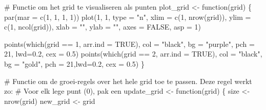 \documentclass[
  a4paper,
]{scrbook}
\newenvironment{Shaded}{\begin{snugshade}}{\end{snugshade}}
\newcommand{\AttributeTok}[1]{\textcolor[rgb]{0.40,0.45,0.13}{#1}}
\newcommand{\CommentTok}[1]{\textcolor[rgb]{0.37,0.37,0.37}{#1}}
\newcommand{\ConstantTok}[1]{\textcolor[rgb]{0.56,0.35,0.01}{#1}}
\newcommand{\ControlFlowTok}[1]{\textcolor[rgb]{0.00,0.23,0.31}{#1}}
\newcommand{\DecValTok}[1]{\textcolor[rgb]{0.68,0.00,0.00}{#1}}
\newcommand{\FloatTok}[1]{\textcolor[rgb]{0.68,0.00,0.00}{#1}}
\newcommand{\FunctionTok}[1]{\textcolor[rgb]{0.28,0.35,0.67}{#1}}
\newcommand{\NormalTok}[1]{\textcolor[rgb]{0.00,0.23,0.31}{#1}}
\newcommand{\OtherTok}[1]{\textcolor[rgb]{0.00,0.23,0.31}{#1}}
\newcommand{\SpecialCharTok}[1]{\textcolor[rgb]{0.37,0.37,0.37}{#1}}
\newcommand{\StringTok}[1]{\textcolor[rgb]{0.13,0.47,0.30}{#1}}
\theoremstyle{definition}
\theoremstyle{remark}
\begin{document}
\begin{Shaded}
\begin{Highlighting}[]
\CommentTok{\# Functie om het grid te visualiseren als punten}
\NormalTok{plot\_grid }\OtherTok{\textless{}{-}} \ControlFlowTok{function}\NormalTok{(grid) \{}
  \FunctionTok{par}\NormalTok{(}\AttributeTok{mar =} \FunctionTok{c}\NormalTok{(}\DecValTok{1}\NormalTok{, }\DecValTok{1}\NormalTok{, }\DecValTok{1}\NormalTok{, }\DecValTok{1}\NormalTok{))}
  \FunctionTok{plot}\NormalTok{(}\DecValTok{1}\NormalTok{, }\DecValTok{1}\NormalTok{, }\AttributeTok{type =} \StringTok{"n"}\NormalTok{, }\AttributeTok{xlim =} \FunctionTok{c}\NormalTok{(}\DecValTok{1}\NormalTok{, }\FunctionTok{nrow}\NormalTok{(grid)), }\AttributeTok{ylim =} \FunctionTok{c}\NormalTok{(}\DecValTok{1}\NormalTok{, }\FunctionTok{ncol}\NormalTok{(grid)), }\AttributeTok{xlab =} \StringTok{""}\NormalTok{, }\AttributeTok{ylab =} \StringTok{""}\NormalTok{, }\AttributeTok{axes =} \ConstantTok{FALSE}\NormalTok{, }\AttributeTok{asp =} \DecValTok{1}\NormalTok{)}
  
  \FunctionTok{points}\NormalTok{(}\FunctionTok{which}\NormalTok{(grid }\SpecialCharTok{==} \DecValTok{1}\NormalTok{, }\AttributeTok{arr.ind =} \ConstantTok{TRUE}\NormalTok{), }\AttributeTok{col =} \StringTok{"black"}\NormalTok{, }\AttributeTok{bg =} \StringTok{"purple"}\NormalTok{, }\AttributeTok{pch =} \DecValTok{21}\NormalTok{, }\AttributeTok{lwd=}\FloatTok{0.2}\NormalTok{, }\AttributeTok{cex =} \FloatTok{0.5}\NormalTok{)}
  \FunctionTok{points}\NormalTok{(}\FunctionTok{which}\NormalTok{(grid }\SpecialCharTok{==} \DecValTok{2}\NormalTok{, }\AttributeTok{arr.ind =} \ConstantTok{TRUE}\NormalTok{), }\AttributeTok{col =} \StringTok{"black"}\NormalTok{, }\AttributeTok{bg =} \StringTok{"gold"}\NormalTok{, }\AttributeTok{pch =} \DecValTok{21}\NormalTok{,}\AttributeTok{lwd=}\FloatTok{0.2}\NormalTok{, }\AttributeTok{cex =} \FloatTok{0.5}\NormalTok{)}
\NormalTok{\}}

\CommentTok{\# Functie om de groei{-}regels over het hele grid toe te passen. Deze regel werkt zo:}
\CommentTok{\# Voor elk lege punt (0), pak een }
\NormalTok{update\_grid }\OtherTok{\textless{}{-}} \ControlFlowTok{function}\NormalTok{(grid) \{}
\NormalTok{  size }\OtherTok{\textless{}{-}} \FunctionTok{nrow}\NormalTok{(grid)}
\NormalTok{  new\_grid }\OtherTok{\textless{}{-}}\NormalTok{ grid}
  

\end{Highlighting}
\end{Shaded}
\end{document}
